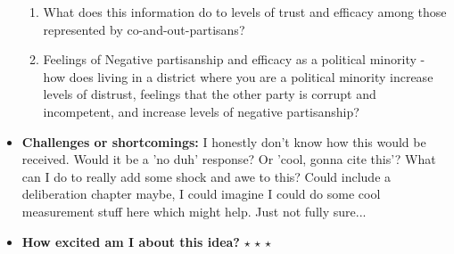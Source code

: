 \documentclass[12pt]{article}
\begin{document}
\begin{itemize}
\begin{enumerate}
            \item What does this information do to levels of trust and efficacy among those represented by co-and-out-partisans?
            \item Feelings of Negative partisanship and efficacy as a political minority - how does living in a district where you are a political minority increase levels of distrust, feelings that the other party is corrupt and incompetent, and increase levels of negative partisanship?
        \end{enumerate}
        \item \textbf{Challenges or shortcomings:} I honestly don't know how this would be received. Would it be a 'no duh' response? Or 'cool, gonna cite this'? What can I do to really add some shock and awe to this? Could include a deliberation chapter maybe, I could imagine I could do some cool measurement stuff here which might help. Just not fully sure...
        \item \textbf{How excited am I about this idea?} $\star$ $\star$ $\star$
    \end{itemize}
\end{document}
